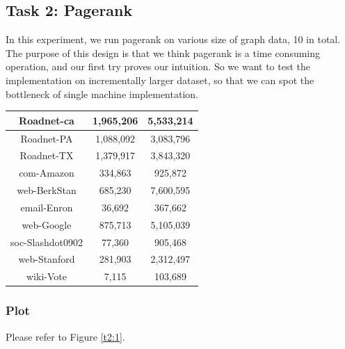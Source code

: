 \subsection{Task 2: Pagerank}
In this experiment, we run pagerank on various size of graph data, 10 in total. The purpose of this design is that we think pagerank is a time consuming operation, and our first try proves our intuition. So we want to test the implementation on incrementally larger dataset, so that we can spot the bottleneck of single machine implementation. 

\begin{center}
\begin{tabular}{| c | c | c |}
    \hline
    Roadnet-ca & 1,965,206 & 5,533,214 \\ \hline
    Roadnet-PA & 1,088,092 & 3,083,796 \\ \hline
    Roadnet-TX & 1,379,917 & 3,843,320 \\ \hline
    com-Amazon & 334,863 & 925,872 \\ \hline
    web-BerkStan & 685,230 & 7,600,595 \\ \hline
    email-Enron & 36,692 & 367,662 \\ \hline
    web-Google & 875,713 & 5,105,039 \\ \hline
    soc-Slashdot0902 & 77,360 & 905,468 \\ \hline
    web-Stanford & 281,903 & 2,312,497 \\ \hline
    wiki-Vote & 7,115 & 103,689 \\ \hline
\end{tabular}
\end{center}

\subsubsection{Plot}
Please refer to Figure \ref{t2:1}.

